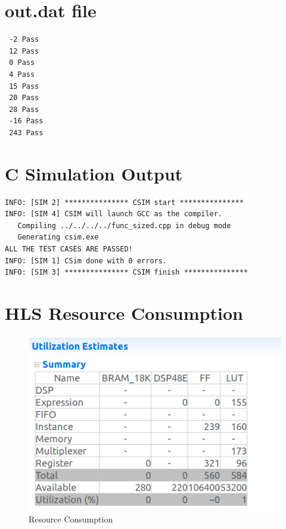 \documentclass{article}
\begin{document}
\section{out.dat file}
\begin{lstlisting}
 -2 Pass
 12 Pass
 0 Pass
 4 Pass
 15 Pass
 20 Pass
 28 Pass
 -16 Pass
 243 Pass
\end{lstlisting}
\vspace{5cm}


\section{C Simulation Output}
\begin{lstlisting}
INFO: [SIM 2] *************** CSIM start ***************
INFO: [SIM 4] CSIM will launch GCC as the compiler.
   Compiling ../../../../func_sized.cpp in debug mode
   Generating csim.exe
ALL THE TEST CASES ARE PASSED!
INFO: [SIM 1] CSim done with 0 errors.
INFO: [SIM 3] *************** CSIM finish ***************

\end{lstlisting}
\vspace{15cm}


\section{HLS Resource Consumption}
\vspace{3cm}
\begin{figure}[h]
    \centering
\includegraphics[width=\columnwidth]{1.png}
    \caption{Resource Consumption}
    \label{fig:my_label}
\end{figure}
\end{document}
